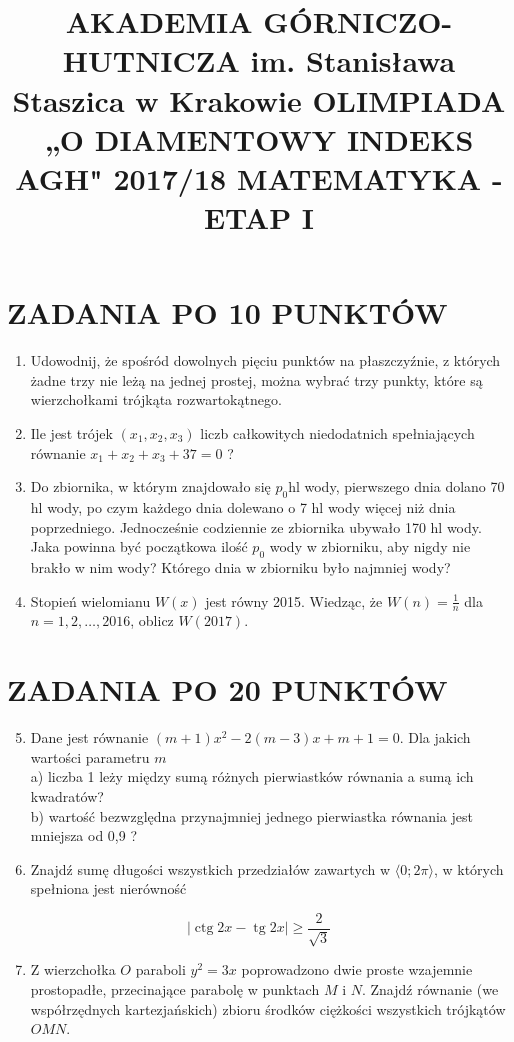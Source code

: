 \documentclass[10pt]{article}
\title{AKADEMIA GÓRNICZO-HUTNICZA im. Stanisława Staszica w Krakowie OLIMPIADA „O DIAMENTOWY INDEKS AGH" 2017/18 MATEMATYKA - ETAP I }
\author{}
\date{}
\begin{document}
\maketitle
\section*{ZADANIA PO 10 PUNKTÓW}
\begin{enumerate}
  \item Udowodnij, że spośród dowolnych pięciu punktów na płaszczyźnie, z których żadne trzy nie leżą na jednej prostej, można wybrać trzy punkty, które są wierzchołkami trójkąta rozwartokątnego.
  \item Ile jest trójek $\left(x_{1}, x_{2}, x_{3}\right)$ liczb całkowitych niedodatnich spełniających równanie $x_{1}+x_{2}+x_{3}+37=0$ ?
  \item Do zbiornika, w którym znajdowało się $p_{0} \mathrm{hl}$ wody, pierwszego dnia dolano 70 hl wody, po czym każdego dnia dolewano o 7 hl wody więcej niż dnia poprzedniego. Jednocześnie codziennie ze zbiornika ubywało 170 hl wody. Jaka powinna być początkowa ilość $p_{0}$ wody w zbiorniku, aby nigdy nie brakło w nim wody? Którego dnia w zbiorniku było najmniej wody?
  \item Stopień wielomianu $W(x)$ jest równy 2015. Wiedząc, że $W(n)=\frac{1}{n}$ dla $n=1,2, \ldots, 2016$, oblicz $W(2017)$.
\end{enumerate}

\section*{ZADANIA PO 20 PUNKTÓW}
\begin{enumerate}
  \setcounter{enumi}{4}
  \item Dane jest równanie $(m+1) x^{2}-2(m-3) x+m+1=0$. Dla jakich wartości parametru $m$\\
a) liczba 1 leży między sumą różnych pierwiastków równania a sumą ich kwadratów?\\
b) wartość bezwzględna przynajmniej jednego pierwiastka równania jest mniejsza od 0,9 ?
  \item Znajdź sumę długości wszystkich przedziałów zawartych w $\langle 0 ; 2 \pi\rangle$, w których spełniona jest nierówność
\end{enumerate}

$$
|\operatorname{ctg} 2 x-\operatorname{tg} 2 x| \geqslant \frac{2}{\sqrt{3}}
$$

\begin{enumerate}
  \setcounter{enumi}{6}
  \item Z wierzchołka $O$ paraboli $y^{2}=3 x$ poprowadzono dwie proste wzajemnie prostopadłe, przecinające parabolę w punktach $M$ i $N$. Znajdź równanie (we współrzędnych kartezjańskich) zbioru środków ciężkości wszystkich trójkątów $O M N$.
\end{enumerate}
\end{document}
